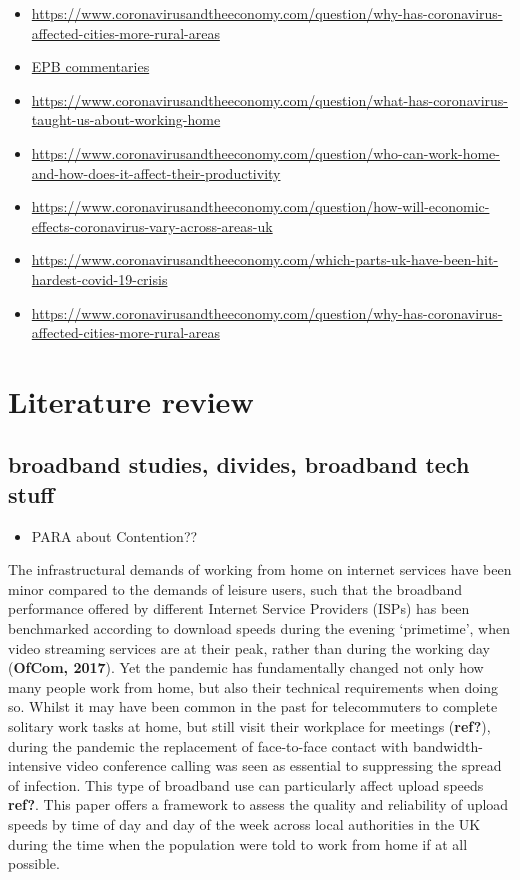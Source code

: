 \documentclass[]{interact}
\theoremstyle{plain}%
\theoremstyle{definition}
\theoremstyle{remark}
\def\tightlist{}
\begin{document}
\begin{itemize}
\tightlist
\item
  \url{https://www.coronavirusandtheeconomy.com/question/why-has-coronavirus-affected-cities-more-rural-areas}
\item
  \href{https://journals.sagepub.com/toc/EPB/current}{EPB commentaries}
\item
  \url{https://www.coronavirusandtheeconomy.com/question/what-has-coronavirus-taught-us-about-working-home}
\item
  \url{https://www.coronavirusandtheeconomy.com/question/who-can-work-home-and-how-does-it-affect-their-productivity}
\item
  \url{https://www.coronavirusandtheeconomy.com/question/how-will-economic-effects-coronavirus-vary-across-areas-uk}
\item
  \url{https://www.coronavirusandtheeconomy.com/which-parts-uk-have-been-hit-hardest-covid-19-crisis}
\item
  \url{https://www.coronavirusandtheeconomy.com/question/why-has-coronavirus-affected-cities-more-rural-areas}
\end{itemize}

\hypertarget{literature-review}{%
\section{Literature review}\label{literature-review}}

\hypertarget{broadband-studies-divides-broadband-tech-stuff}{%
\subsection{broadband studies, divides, broadband tech
stuff}\label{broadband-studies-divides-broadband-tech-stuff}}

\begin{itemize}
\tightlist
\item
  PARA about Contention??
\end{itemize}

The infrastructural demands of working from home on internet services
have been minor compared to the demands of leisure users, such that the
broadband performance offered by different Internet Service Providers
(ISPs) has been benchmarked according to download speeds during the
evening `primetime', when video streaming services are at their peak,
rather than during the working day (\textbf{OfCom, 2017}). Yet the
pandemic has fundamentally changed not only how many people work from
home, but also their technical requirements when doing so. Whilst it may
have been common in the past for telecommuters to complete solitary work
tasks at home, but still visit their workplace for meetings
(\textbf{ref?}), during the pandemic the replacement of face-to-face
contact with bandwidth-intensive video conference calling was seen as
essential to suppressing the spread of infection. This type of broadband
use can particularly affect upload speeds \textbf{ref?}. This paper
offers a framework to assess the quality and reliability of upload
speeds by time of day and day of the week across local authorities in
the UK during the time when the population were told to work from home
if at all possible.
\end{document}
